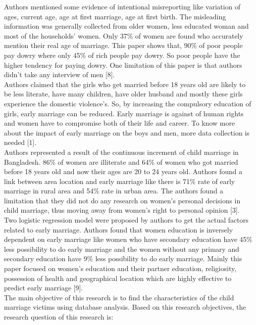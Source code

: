 \documentclass{article}
\begin{document}
    Authors mentioned some evidence of intentional misreporting like variation of ages, current age, age at first marriage, age at first birth. The misleading information was generally collected from older women, less educated woman and most of the households' women. Only 37\% of women are found who accurately mention their real age of marriage. This paper shows that, 90\% of poor people pay dowry where only 45\% of rich people pay dowry. So poor people have the higher tendency for paying dowry. One limitation of this paper is that authors didn’t take any interview of men [8]. \\
    Authors claimed that the girls who get married before 18 years old are likely to be less literate, have many children, have older husband and mostly these girls experience the domestic violence's. So, by increasing the compulsory education of girls, early marriage can be reduced. Early marriage is against of human rights and women have to compromise both of their life and career. To know more about the impact of early marriage on the boys and men, more data collection is needed [1]. \\
    Authors represented a result of the continuous increment of child marriage in Bangladesh. 86\% of women are illiterate and 64\% of women who got married before 18 years old and now their ages are 20 to 24 years old. Authors found a link between area location and early marriage like there is 71\% rate of early marriage in rural area and 54\% rate in urban area. The authors found a limitation that they did not do any research on women's personal decisions in child marriage, thus moving away from women's right to personal opinion [3]. \\
    Two logistic regression model were proposed by authors to get the actual factors related to early marriage. Authors found that women education is inversely dependent on early marriage like women who have secondary education have 45\% less possibility to do early marriage and the women without any primary and secondary education have 9\% less possibility to do early marriage. Mainly this paper focused on women’s education and their partner education, religiosity, possession of health and geographical location which are highly effective to predict early marriage [9]. \\
    The main objective of this research is to find the characteristics of the child marriage victims using database analysis. Based on this research objectives, the research question of this research is: 
    
\end{document}
